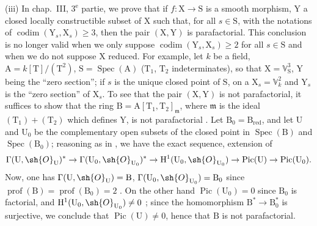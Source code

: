 \begin{env}[21.14.4]
(iii) In chap.~III, $3^{\text{e}}$ partie, we prove that if $f:\mathrm{X}\to\mathrm{S}$ is a smooth morphism, $\mathrm{Y}$ a closed locally constructible subset of $\mathrm{X}$ such that, for all $s\in\mathrm{S}$, with the notations of  $\operatorname{codim}(\mathrm{Y}_s,\mathrm{X}_s)\geq 3$, then the pair $(\mathrm{X},\mathrm{Y})$ is parafactorial.
This conclusion is no longer valid when we only suppose $\operatorname{codim}(\mathrm{Y}_s,\mathrm{X}_s)\geq 2$ for all $s\in\mathrm{S}$ and when we do not suppose $\mathrm{X}$ reduced.
For example, let $k$ be a field, $\mathrm{A}=k[\mathrm{T}]/(\mathrm{T}^2)$, $\mathrm{S}=\operatorname{Spec}(\mathrm{A})$ ($\mathrm{T}_1$, $\mathrm{T}_2$ indeterminates), so that $\mathrm{X}=\mathbb{V}_{\mathrm{S}}^3$, $\mathrm{Y}$ being the ``zero section''; if $s$ is the unique closed point of $\mathrm{S}$, on a $\mathrm{X}_s=\mathbb{V}_k^2$ and $\mathrm{Y}_s$ is the ``zero section'' of $\mathrm{X}_s$.
To see that the pair $(\mathrm{X},\mathrm{Y})$ is not parafactorial, it suffices to show that the ring $\mathrm{B}=\mathrm{A}[\mathrm{T}_1,\mathrm{T}_2]_\mathfrak{m}$, where $\mathfrak{m}$ is the ideal $(\mathrm{T}_1)+(\mathrm{T}_2)$ which defines $\mathrm{Y}$, is not parafactorial .
Let $\mathrm{B}_0=\mathrm{B}_{\mathrm{red}}$, and let $\mathrm{U}$ and $\mathrm{U}_0$ be the complementary open subsets of the closed point in $\operatorname{Spec}(\mathrm{B})$ and $\operatorname{Spec}(\mathrm{B}_0)$; reasoning as in , we have the exact sequence, extension of 
\[
  \Gamma(\mathrm{U},\sh{O}_{\mathrm{U}})^*\to\Gamma(\mathrm{U}_0,\sh{O}_{\mathrm{U}_0})^*\to\mathrm{H}^1(\mathrm{U}_0,\sh{O}_{\mathrm{U}_0})\to\operatorname{Pic}(\mathrm{U})\to\operatorname{Pic}(\mathrm{U}_0).
\]
Now, one has $\Gamma(\mathrm{U},\sh{O}_{\mathrm{U}})=\mathrm{B}$, $\Gamma(\mathrm{U}_0,\sh{O}_{\mathrm{U}_0})=\mathrm{B}_0$ since $\operatorname{prof}(\mathrm{B})=\operatorname{prof}(\mathrm{B}_0)=2$ .
On the other hand $\operatorname{Pic}(\mathrm{U}_0)=0$ since $\mathrm{B}_0$ is factorial, and $\mathrm{H}^1(\mathrm{U}_0,\sh{O}_{\mathrm{U}_0})\neq 0$ \cite[3, Exemple~III-1]{IV-41}; since the homomorphism $\mathrm{B}^*\to\mathrm{B}_0^*$ is surjective, we conclude that $\operatorname{Pic}(\mathrm{U})\neq 0$, hence that $\mathrm{B}$ is not parafactorial.
\end{env}

